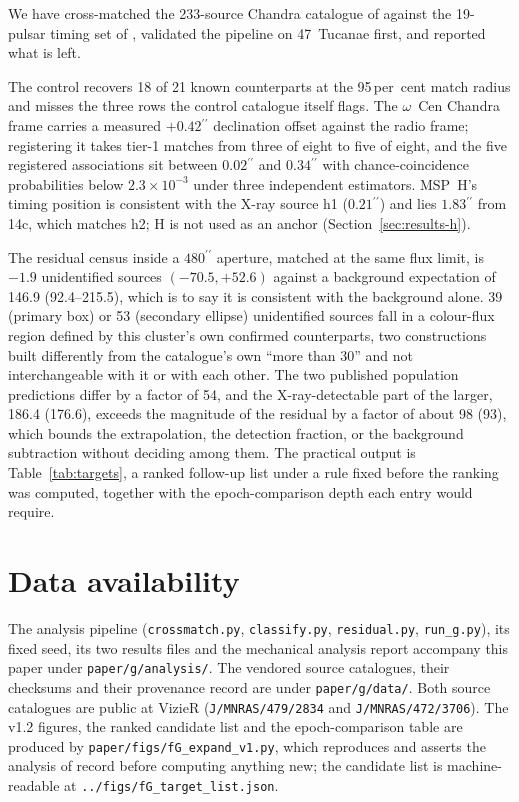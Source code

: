 \documentclass[11pt]{article}
\newcommand{\ocen}{$\omega$~Cen}
\newcommand{\as}{\ensuremath{^{\prime\prime}}}
\begin{document}
We have cross-matched the 233-source Chandra catalogue of \citet{Henleywillis2018} against the 19-pulsar timing set of \citet{ColomiBernadich2026}, validated the pipeline on 47~Tucanae first, and reported what is left.

The control recovers 18 of 21 known counterparts at the 95\,per~cent match radius and misses the three rows the control catalogue itself flags. The \ocen{} Chandra frame carries a measured $+0.42\as$ declination offset against the radio frame; registering it takes tier-1 matches from three of eight to five of eight, and the five registered associations sit between $0.02\as$ and $0.34\as$ with chance-coincidence probabilities below $2.3\times10^{-3}$ under three independent estimators. MSP~H's timing position is consistent with the X-ray source h1 ($0.21\as$) and lies $1.83\as$ from 14c, which matches h2; H is not used as an anchor (Section~\ref{sec:results-h}).

The residual census inside a $480\as$ aperture, matched at the same flux limit, is $-1.9$ unidentified sources $(-70.5, +52.6)$ against a background expectation of 146.9 (92.4--215.5), which is to say it is consistent with the background alone. 39 (primary box) or 53 (secondary ellipse) unidentified sources fall in a colour-flux region defined by this cluster's own confirmed counterparts, two constructions built differently from the catalogue's own ``more than 30'' and not interchangeable with it or with each other. The two published population predictions differ by a factor of 54, and the X-ray-detectable part of the larger, 186.4 (176.6), exceeds the magnitude of the residual by a factor of about 98 (93), which bounds the extrapolation, the detection fraction, or the background subtraction without deciding among them. The practical output is Table~\ref{tab:targets}, a ranked follow-up list under a rule fixed before the ranking was computed, together with the epoch-comparison depth each entry would require.

\section*{Data availability}

The analysis pipeline (\texttt{crossmatch.py}, \texttt{classify.py}, \texttt{residual.py}, \texttt{run\_g.py}), its fixed seed, its two results files and the mechanical analysis report accompany this paper under \texttt{paper/g/analysis/}. The vendored source catalogues, their checksums and their provenance record are under \texttt{paper/g/data/}. Both source catalogues are public at VizieR (\texttt{J/MNRAS/479/2834} and \texttt{J/MNRAS/472/3706}). The v1.2 figures, the ranked candidate list and the epoch-comparison table are produced by \texttt{paper/figs/fG\_expand\_v1.py}, which reproduces and asserts the analysis of record before computing anything new; the candidate list is machine-readable at \texttt{../figs/fG\_target\_list.json}.
\end{document}
